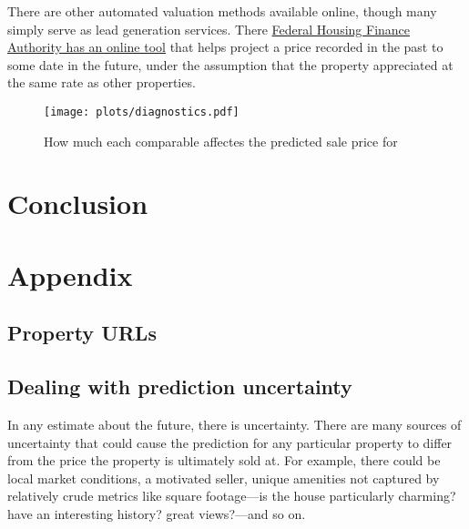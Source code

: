 \documentclass[
12pt, %
letterpaper, %
oneside, %
headinclude,footinclude, %
BCOR5mm, %
]{scrartcl}
\begin{document}
There are other automated valuation methods available online, though many simply serve as lead generation services.
There \href{https://www.fhfa.gov/DataTools/Tools/Pages/HPI-Calculator.aspx}{Federal Housing Finance Authority has an online tool} that helps project a price recorded in the past to some date in the future, under the assumption that the property appreciated at the same rate as other properties. 

\begin{figure}
\centering
\caption{How much each comparable affectes the predicted sale price for \PropertyName{}} \label{fig:diagnostics}  
\texttt{[image: plots/diagnostics.pdf]} 
\end{figure}

\section{Conclusion}


\renewcommand{\refname}{\spacedlowsmallcaps{References}} %


\pagebreak

\appendix

\section{Appendix} 
\subsection{Property URLs} \label{sec:urls}

\begin{itemize}
  
\end{itemize}

\subsection{Dealing with prediction uncertainty}  \label{sec:bootstrapping} 
In any estimate about the future, there is uncertainty.
There are many sources of uncertainty that could cause the prediction for any particular property to differ from the price the property is ultimately sold at.
For example, there could be local market conditions, a motivated seller, unique amenities not captured by relatively crude metrics like square footage---is the house particularly charming? have an interesting history? great views?---and so on. 
\end{document}
